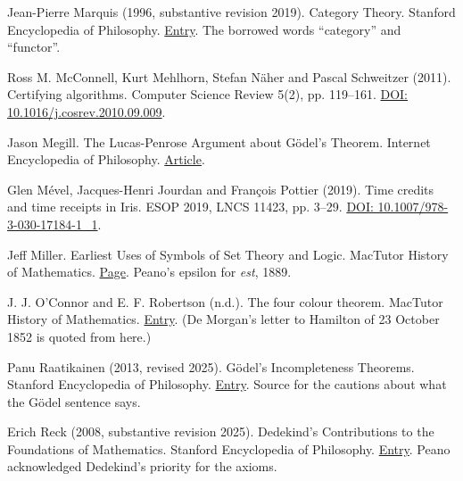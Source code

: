 \documentclass[11pt,twoside]{article}
\theoremstyle{thielethm}
\theoremstyle{thieledef}
\theoremstyle{thieledef}
\theoremstyle{thieledef}
\theoremstyle{thielethm}
\theoremstyle{thieleobs}
\theoremstyle{thielethm}
\begin{document}
\noindent Jean-Pierre Marquis (1996, substantive revision 2019). Category Theory. Stanford Encyclopedia of Philosophy. \href{https://plato.stanford.edu/entries/category-theory/}{Entry}. The borrowed words ``category'' and ``functor''.
\par\medskip

\noindent Ross M. McConnell, Kurt Mehlhorn, Stefan Näher and Pascal Schweitzer (2011). Certifying algorithms. Computer Science Review 5(2), pp. 119--161. \href{https://doi.org/10.1016/j.cosrev.2010.09.009}{DOI: 10.1016/j.cosrev.2010.09.009}.
\par\medskip

\noindent Jason Megill. The Lucas-Penrose Argument about Gödel's Theorem. Internet Encyclopedia of Philosophy. \href{https://iep.utm.edu/lp-argue/}{Article}.
\par\medskip

\noindent Glen Mével, Jacques-Henri Jourdan and François Pottier (2019). Time credits and time receipts in Iris. ESOP 2019, LNCS 11423, pp. 3--29. \href{https://doi.org/10.1007/978-3-030-17184-1_1}{DOI: 10.1007/978-3-030-17184-1\_1}.
\par\medskip

\noindent Jeff Miller. Earliest Uses of Symbols of Set Theory and Logic. MacTutor History of Mathematics. \href{https://mathshistory.st-andrews.ac.uk/Miller/mathsym/set/}{Page}. Peano's epsilon for \emph{est}, 1889.
\par\medskip

\noindent J. J. O'Connor and E. F. Robertson (n.d.). The four colour theorem. MacTutor History of Mathematics. \href{https://mathshistory.st-andrews.ac.uk/HistTopics/The_four_colour_theorem/}{Entry}. (De Morgan's letter to Hamilton of 23 October 1852 is quoted from here.)
\par\medskip

\noindent Panu Raatikainen (2013, revised 2025). Gödel's Incompleteness Theorems. Stanford Encyclopedia of Philosophy. \href{https://plato.stanford.edu/entries/goedel-incompleteness/}{Entry}. Source for the cautions about what the Gödel sentence says.
\par\medskip

\noindent Erich Reck (2008, substantive revision 2025). Dedekind's Contributions to the Foundations of Mathematics. Stanford Encyclopedia of Philosophy. \href{https://plato.stanford.edu/entries/dedekind-foundations/}{Entry}. Peano acknowledged Dedekind's priority for the axioms.
\par\medskip
\end{document}
